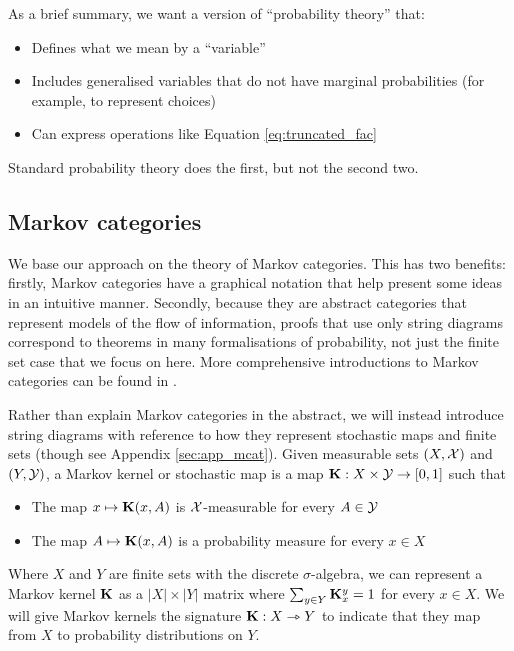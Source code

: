 As a brief summary, we want a version of ``probability theory'' that:
\begin{itemize}
	\item Defines what we mean by a ``variable''
	\item Includes generalised variables that do not have marginal probabilities (for example, to represent choices)
	\item Can express operations like Equation \ref{eq:truncated_fac}
\end{itemize}

Standard probability theory does the first, but not the second two. 

\subsection{Markov categories}
We base our approach on the theory of Markov categories. This has two benefits: firstly, Markov categories have a graphical notation that help present some ideas in an intuitive manner. Secondly, because they are abstract categories that represent models of the flow of information, proofs that use only string diagrams correspond to theorems in many formalisations of probability, not just the finite set case that we focus on here. More comprehensive introductions to Markov categories can be found in \citet{fritz_synthetic_2020,cho_disintegration_2019}.

Rather than explain Markov categories in the abstract, we will instead introduce string diagrams with reference to how they represent stochastic maps and finite sets (though see Appendix \ref{sec:app_mcat}). Given measurable sets $(X,\mathcal{X})$ and $(Y,\mathcal{Y})$, a Markov kernel or stochastic map is a map $\mathbf{K}:X\times \mathcal{Y}\to [0,1]$ such that

\begin{itemize}
	\item The map $x\mapsto \mathbf{K}(x,A)$ is $\mathcal{X}$-measurable for every $A\in \mathcal{Y}$
	\item The map $A\mapsto \mathbf{K}(x,A)$ is a probability measure for every $x\in X$
\end{itemize}

Where $X$ and $Y$ are finite sets with the discrete $\sigma$-algebra, we can represent a Markov kernel $\mathbf{K}$ as a $|X|\times |Y|$ matrix where $\sum_{y\in Y} \mathbf{K}_x^y = 1$ for every $x\in X$. We will give Markov kernels the signature $\mathbf{K}:X\rightarrowtriangle Y$ to indicate that they map from $X$ to probability distributions on $Y$.

